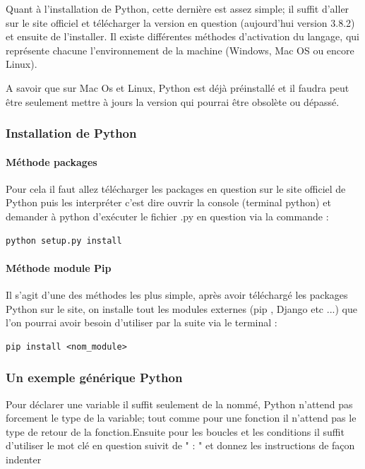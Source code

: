 \documentclass[a4paper, 12pt, twoside]{article}
\begin{document}
Quant à l'installation de Python, cette dernière est assez simple; il suffit d'aller sur le site officiel et télécharger la version en question (aujourd'hui version 3.8.2) et ensuite de l'installer. Il existe différentes méthodes d'activation du langage, qui représente chacune l'environnement de la machine (Windows, Mac OS ou encore Linux).\newline

A savoir que sur Mac Os et Linux, Python est déjà préinstallé et il faudra peut être seulement mettre à jours la version qui pourrai être obsolète ou dépassé.

\subsubsection{Installation de Python} 
\paragraph{Méthode packages}{Pour cela il faut allez télécharger les packages en question sur le site officiel de Python puis les interpréter c'est dire ouvrir la console (terminal python) et demander à python d'exécuter le fichier \textsf{.py} en question via la commande :}
\begin{verbatim}
python setup.py install
\end{verbatim} 

\paragraph{Méthode module Pip} {Il s'agit d'une des méthodes les plus simple, après avoir téléchargé les packages Python sur le site, on installe tout les modules externes (pip , Django etc ...)  que l'on pourrai avoir besoin d'utiliser par la suite via le terminal : }
\begin{verbatim}
pip install <nom_module>
\end{verbatim}

\subsubsection{Un exemple générique Python}
Pour déclarer une variable il suffit seulement de la nommé, Python n'attend pas forcement le type de la variable; tout comme pour une fonction il n'attend pas le type de retour de la fonction.Ensuite pour les boucles et les conditions il suffit d'utiliser le mot clé en question suivit de " : " et donnez les instructions de façon indenter \newline
\end{document}
